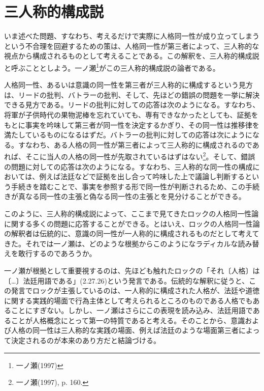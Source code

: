 \documentclass[a4j,oneside]{jsbook}
\begin{document}
\section{
三人称的構成説
}
いま述べた問題、すなわち、考えるだけで実際に人格同一性が成り立ってしまうという不合理を回避するための策は、人格同一性が第三者によって、三人称的な視点から構成されるものとして考えることである。この解釈を、三人称的構成説と呼ぶこととしよう。一ノ瀬\footnote{一ノ瀬(1997)}がこの三人称的構成説の論者である。
\par
人格同一性、あるいは意識の同一性を第三者が三人称的に構成するという見方は、リードの批判、バトラーの批判、そして、先ほどの錯誤の問題を一挙に解決できる見方である。リードの批判に対しての応答は次のようになる。すなわち、将軍が子供時代の果物泥棒を忘れていても、専有できなかったとしても、証拠をもとに事実を吟味して第三者が同一性を決定するかぎり、その同一性は推移律を満たしているものになるはずだ。バトラーの批判に対しての応答は次にようになる。すなわち、ある人格の同一性が第三者によって三人称的に構成されるのであれば、そこに当人の人格の同一性が先取されているはずはない\footnote{一ノ瀬(1997), p. 160.}。そして、錯誤の問題に対しての応答は次のようになる。すなわち、三人称的な同一性の構成においては、例えば法廷などで証拠を出し合って吟味した上で議論し判断するという手続きを踏むことで、事実を参照する形で同一性が判断されるため、この手続きが真なる同一性の主張と偽なる同一性の主張とを見分けることができる。
\par
このように、三人称的構成説によって、ここまで見てきたロックの人格同一性論に関する多くの問題に応答することができる。とはいえ、ロックの人格同一性論の解釈者は伝統的に、意識の同一性が一人称的に構成されるものだとして考えてきた。それでは一ノ瀬は、どのような根拠からこのようになラディカルな読み替えを敢行するのであろうか。
\par
一ノ瀬が根拠として重要視するのは、先ほども触れたロックの「それ〔人格〕は〔…〕法廷用語である」(2.27.26)という発言である。伝統的な解釈に従うと、この発言でロックが主張しているのは、一人称的に構成された人格が、法廷や道徳に関する実践的場面で行為主体として考えられるところのものである人格でもあることにすぎない。しかし、一ノ瀬はさらにこの表現を読み込み、法廷用語であることが人格概念にとって第一の特質であると考える。そのことから、意識および人格の同一性は三人称的な実践の場面、例えば法廷のような場面第三者によって決定されるのが本来のあり方だと結論づける。
\par
\end{document}
